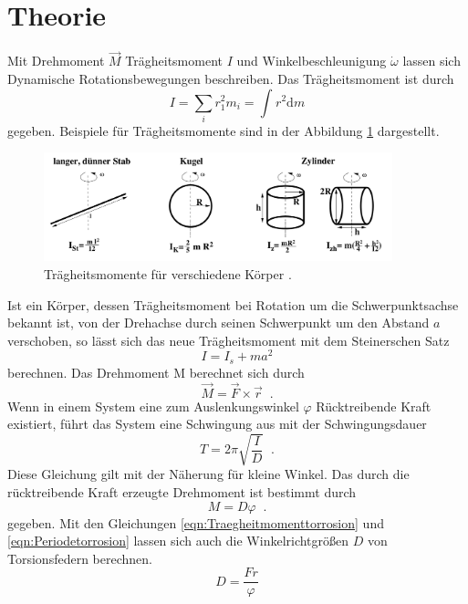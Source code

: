 \section{Theorie}
\label{sec:Theorie}
Mit Drehmoment $\vec{M}$ Trägheitsmoment $I$ und Winkelbeschleunigung $\dot{\omega}$
lassen sich Dynamische Rotationsbewegungen beschreiben. Das Trägheitsmoment ist
durch
\begin{equation}
  I=\sum_i r_1^2m_i=\int_{}^{} r^2 \text{d}m
\end{equation}
gegeben.
Beispiele für Trägheitsmomente sind in der Abbildung \ref{fig:Traegheitsmomente}
dargestellt.
\begin{figure}
  \centering
  \includegraphics[width=0.9\textwidth]{Traegheitsmomente.png}
  \caption{Trägheitsmomente für verschiedene Körper \cite{sample}.}
  \label{fig:Traegheitsmomente}
\end{figure}
Ist ein Körper, dessen Trägheitsmoment bei Rotation um die Schwerpunktsachse
bekannt ist, von der Drehachse durch seinen Schwerpunkt um den Abstand $a$
verschoben, so lässt sich das neue Trägheitsmoment mit dem Steinerschen Satz
\begin{equation}
  I=I_s+m a^2
  \label{eqn:steiner}
\end{equation}
berechnen. Das Drehmoment M berechnet sich durch
\begin{equation}
  \vec{M}=\vec{F}\times\vec{r}\;\;.
\end{equation}
Wenn in einem System eine zum Auslenkungswinkel $\varphi$ Rücktreibende Kraft
existiert, führt das System eine Schwingung aus mit der Schwingungsdauer
\begin{equation}
  T=2\pi\sqrt{\frac{I}{D}}\;\;.
  \label{eqn:Periodetorrosion}
\end{equation}
Diese Gleichung gilt mit der Näherung für kleine Winkel.
Das durch die rücktreibende Kraft erzeugte Drehmoment ist bestimmt durch
\begin{equation}
  M=D \varphi\;\;.
  \label{eqn:Traegheitmomenttorrosion}
\end{equation}
gegeben. Mit den Gleichungen \eqref{eqn:Traegheitmomenttorrosion} und
\eqref{eqn:Periodetorrosion} lassen sich auch die Winkelrichtgrößen $D$ von
Torsionsfedern berechnen.
\begin{equation}
  D=\frac{Fr}{\varphi}
  \label{eqn:Winkelrichtgroesse}
\end{equation}
\cite{sample}
